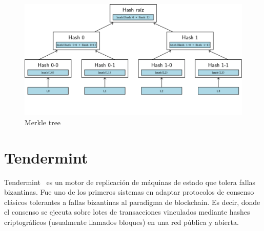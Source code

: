 \begin{figure}[h]
  \centering
  \includegraphics[scale=0.4]{figures/merkle-tree.png}
  \caption{Merkle tree}
  \label{fig:merkle-tree}
\end{figure}




\section{Tendermint}\label{sec:tendermint}
Tendermint~\cite{Buchman.2018.Tendermint} es un motor de replicación de máquinas de estado que tolera fallas bizantinas. 
%
Fue uno de los primeros sistemas en adaptar protocolos de consenso clásicos tolerantes a fallas bizantinas
al paradigma de blockchain.
%
Es decir, donde el consenso se ejecuta sobre lotes de transacciones vinculados mediante
hashes criptográficos (usualmente llamados bloques) en una red pública y abierta.

